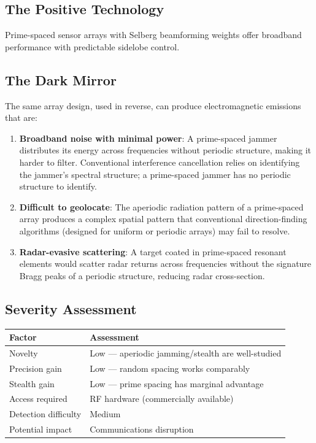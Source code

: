 \documentclass[11pt,a4paper]{article}
\begin{document}
\subsection{The Positive Technology}

Prime-spaced sensor arrays with Selberg beamforming weights offer
broadband performance with predictable sidelobe control.

\subsection{The Dark Mirror}

The same array design, used in reverse, can produce electromagnetic
emissions that are:

\begin{enumerate}
  \item \textbf{Broadband noise with minimal power}: A prime-spaced
    jammer distributes its energy across frequencies without
    periodic structure, making it harder to filter. Conventional
    interference cancellation relies on identifying the jammer's
    spectral structure; a prime-spaced jammer has no periodic
    structure to identify.

  \item \textbf{Difficult to geolocate}: The aperiodic radiation
    pattern of a prime-spaced array produces a complex spatial
    pattern that conventional direction-finding algorithms
    (designed for uniform or periodic arrays) may fail to resolve.

  \item \textbf{Radar-evasive scattering}: A target coated in
    prime-spaced resonant elements would scatter radar returns
    across frequencies without the signature Bragg peaks of a
    periodic structure, reducing radar cross-section.
\end{enumerate}

\subsection{Severity Assessment}

\begin{center}
\begin{tabular}{@{}ll@{}}
\toprule
\textbf{Factor} & \textbf{Assessment} \\
\midrule
Novelty & Low --- aperiodic jamming/stealth are well-studied \\
Precision gain & Low --- random spacing works comparably \\
Stealth gain & Low --- prime spacing has marginal advantage \\
Access required & RF hardware (commercially available) \\
Detection difficulty & Medium \\
Potential impact & Communications disruption \\
\bottomrule
\end{tabular}
\end{center}
\end{document}
